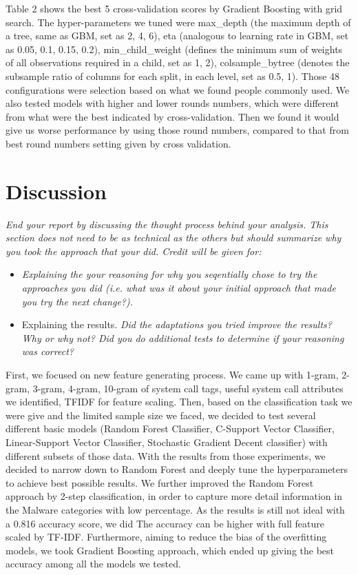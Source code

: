\documentclass[11pt]{article}
\begin{document}
Table 2 shows the best 5 cross-validation scores by Gradient Boosting with grid search. The hyper-parameters we tuned were max\_depth (the maximum depth of a tree, same as GBM, set as 2, 4, 6), eta (analogous to learning rate in GBM, set as 0.05, 0.1, 0.15, 0.2),  min\_child\_weight (defines the minimum sum of weights of all observations required in a child, set as 1, 2), colsample\_bytree (denotes the subsample ratio of columns for each split, in each level, set as 0.5, 1). Those 48 configurations were selection based on what we found people commonly used. We also tested models with higher and lower rounds numbers, which were different from what were the best indicated by cross-validation. Then we found it would give us worse performance by using those round numbers, compared to that from best round numbers setting given by cross validation.


\section{Discussion} 


\textit{End your report by discussing the thought process behind your
analysis. This section does not need to be as technical as the others 
but should summarize why you took the approach that your did. Credit will be given for:
}
  \begin{itemize}
  \item \textit{Explaining the your reasoning for why you seqentially chose to
    try the approaches you did (i.e. what was it about your initial
    approach that made you try the next change?).  }
  \item Explaining the results.  \textit{Did the adaptations you tried improve
    the results?  Why or why not?  Did you do additional tests to
    determine if your reasoning was correct?  }
  \end{itemize}
 
First, we focused on new feature generating process. We came up with 1-gram, 2-gram, 3-gram, 4-gram, 10-gram of system call tags, useful system call attributes we identified, TFIDF for feature scaling. Then, based on the classification task we were give and the limited sample size we faced, we decided to test several different basic models (Random Forest Classifier, C-Support Vector Classifier, Linear-Support Vector Classifier, Stochastic Gradient Decent classifier) with different subsets of those data. With the results from those experiments, we decided to narrow down to Random Forest and deeply tune the hyperparameters to achieve best possible results. We further improved the Random Forest approach by 2-step classification, in order to capture more detail information in the Malware categories with low percentage. As the results is still not ideal with a 0.816 accuracy score, we did The accuracy can be higher with full feature scaled by TF-IDF. Furthermore, aiming to reduce the bias of the overfitting models, we took Gradient Boosting approach, which ended up giving the best accuracy among all the models we tested. 
\end{document}
